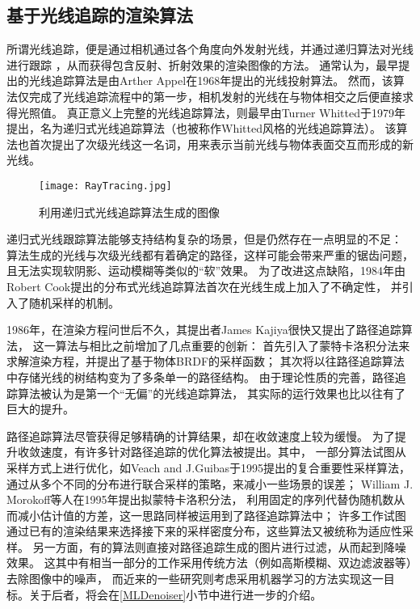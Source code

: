 \subsection{基于光线追踪的渲染算法}

所谓光线追踪，便是通过相机通过各个角度向外发射光线，并通过递归算法对光线进行跟踪
，从而获得包含反射、折射效果的渲染图像的方法。
通常认为，最早提出的光线追踪算法是由Arther Appel在1968年提出的光线投射算法\cite{Appel:1968:TSM:1468075.1468082}。
然而，该算法仅完成了光线追踪流程中的第一步，相机发射的光线在与物体相交之后便直接求得光照值。
真正意义上完整的光线追踪算法，则最早由Turner Whitted于1979年提出，名为递归式光线追踪算法\cite{whitted1979improved}（也被称作Whitted风格的光线追踪算法）。
该算法也首次提出了次级光线这一名词，用来表示当前光线与物体表面交互而形成的新光线。

\begin{figure}[h]
    \centering
    \texttt{[image: RayTracing.jpg]}
    \caption{利用递归式光线追踪算法生成的图像}
    \label{tab:rayTrace}
\end{figure}

递归式光线跟踪算法能够支持结构复杂的场景，但是仍然存在一点明显的不足：
算法生成的光线与次级光线都有着确定的路径，这样可能会带来严重的锯齿问题，
且无法实现软阴影、运动模糊等类似的“软”效果。
为了改进这点缺陷，1984年由Robert Cook提出的分布式光线追踪算法\cite{cook1984distributed}首次在光线生成上加入了不确定性，
并引入了随机采样的机制。

1986年，在渲染方程问世后不久，其提出者James Kajiya很快又提出了路径追踪算法，
这一算法与相比之前增加了几点重要的创新：
首先引入了蒙特卡洛积分法来求解渲染方程，并提出了基于物体BRDF的采样函数；
其次将以往路径追踪算法中存储光线的树结构变为了多条单一的路径结构。
由于理论性质的完善，路径追踪算法被认为是第一个“无偏”的光线追踪算法，
其实际的运行效果也比以往有了巨大的提升。

\label{PathTracingOptimization}
路径追踪算法尽管获得足够精确的计算结果，却在收敛速度上较为缓慢。
为了提升收敛速度，有许多针对路径追踪的优化算法被提出。其中，
一部分算法试图从采样方式上进行优化，如Veach and J.Guibas于1995提出的复合重要性采样\cite{Veach:1995:OCS:218380.218498}算法，
通过从多个不同的分布进行联合采样的策略，来减小一些场景的误差；
William J. Morokoff等人在1995年提出拟蒙特卡洛积分法\cite{Morokoff:1995:QCI:219503.219511}，
利用固定的序列代替伪随机数从而减小估计值的方差，这一思路同样被运用到了路径追踪算法中；
许多工作\cite{Belcour:2013:CTE:2487228.2487239}\cite{dammertz2010hierarchical}试图通过已有的渲染结果来选择接下来的采样密度分布，这些算法又被统称为适应性采样。
另一方面，有的算法则直接对路径追踪生成的图片进行过滤，从而起到降噪效果。
这其中有相当一部分的工作采用传统方法（例如高斯模糊、双边滤波器等）去除图像中的噪声\cite{Sen2012OnFT}\cite{Rousselle2011AdaptiveSA}，
而近来的一些研究则考虑采用机器学习的方法实现这一目标。关于后者，将会在\ref{MLDenoiser}小节中进行进一步的介绍。

